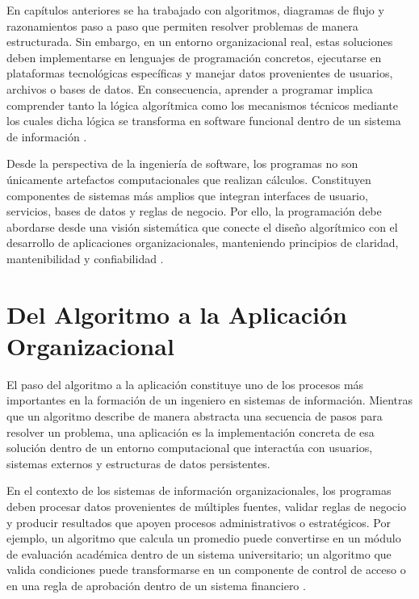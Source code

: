 \documentclass[12pt,twoside]{book}
\begin{document}
			En capítulos anteriores se ha trabajado con algoritmos, diagramas de flujo y razonamientos paso a paso que permiten resolver problemas de manera estructurada. Sin embargo, en un entorno organizacional real, estas soluciones deben implementarse en lenguajes de programación concretos, ejecutarse en plataformas tecnológicas específicas y manejar datos provenientes de usuarios, archivos o bases de datos. En consecuencia, aprender a programar implica comprender tanto la lógica algorítmica como los mecanismos técnicos mediante los cuales dicha lógica se transforma en software funcional dentro de un sistema de información \cite{SWEBOK2025Guide,ISOIECIEEE2018Requirements,Kendall2014Systems}.
			
			Desde la perspectiva de la ingeniería de software, los programas no son únicamente artefactos computacionales que realizan cálculos. Constituyen componentes de sistemas más amplios que integran interfaces de usuario, servicios, bases de datos y reglas de negocio. Por ello, la programación debe abordarse desde una visión sistemática que conecte el diseño algorítmico con el desarrollo de aplicaciones organizacionales, manteniendo principios de claridad, mantenibilidad y confiabilidad \cite{Pressman2019Software,Sommerville2015Software,Martin2008Clean,McConnell2004Code}.
			
			\section{Del Algoritmo a la Aplicación Organizacional}
				\noindent
				El paso del algoritmo a la aplicación constituye uno de los procesos más importantes en la formación de un ingeniero en sistemas de información. Mientras que un algoritmo describe de manera abstracta una secuencia de pasos para resolver un problema, una aplicación es la implementación concreta de esa solución dentro de un entorno computacional que interactúa con usuarios, sistemas externos y estructuras de datos persistentes.
				
				En el contexto de los sistemas de información organizacionales, los programas deben procesar datos provenientes de múltiples fuentes, validar reglas de negocio y producir resultados que apoyen procesos administrativos o estratégicos. Por ejemplo, un algoritmo que calcula un promedio puede convertirse en un módulo de evaluación académica dentro de un sistema universitario; un algoritmo que valida condiciones puede transformarse en un componente de control de acceso o en una regla de aprobación dentro de un sistema financiero \cite{Laudon2020Management,Kendall2014Systems}.
				
\end{document}
